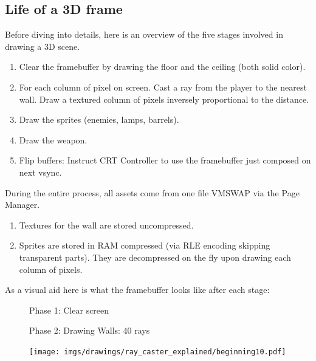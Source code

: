 \subsection{Life of a 3D frame}
Before diving into details, here is an overview of the five stages involved in drawing a 3D scene.\\
\begin{enumerate}
 \item Clear the framebuffer by drawing the floor and the ceiling (both solid color).
 \item For each column of pixel on screen. Cast a ray from the player to the nearest wall. Draw a textured column of pixels inversely proportional to the distance.
 \item Draw the sprites (enemies, lamps, barrels).
 \item Draw the weapon.	
 \item Flip buffers: Instruct CRT Controller to use the framebuffer just composed on next vsync.
\end{enumerate}
During the entire process, all assets come from one file VMSWAP via the Page Manager.\\
\begin{enumerate}
	\item Textures for the wall are stored uncompressed.
	\item Sprites are stored in RAM compressed (via RLE encoding skipping transparent parts). They are decompressed on the fly upon drawing each column of pixels.
\end{enumerate}
As a visual aid here is what the framebuffer looks like after each stage:\\
\begin{figure}[H]
\centering
 \caption{Phase 1: Clear screen}
 \end{figure}




\begin{figure}[H]
 \centering
  \caption{Phase 2: Drawing Walls: 40 rays} 
\end{figure}
\begin{minipage}{.4\textwidth}
 \end{minipage}
\begin{minipage}{.6\textwidth}
\begin{figure}[H]
  \begin{flushright}
 \texttt{[image: imgs/drawings/ray\_caster\_explained/beginning10.pdf]}
   \end{flushright}
\end{figure}
\end{minipage}




